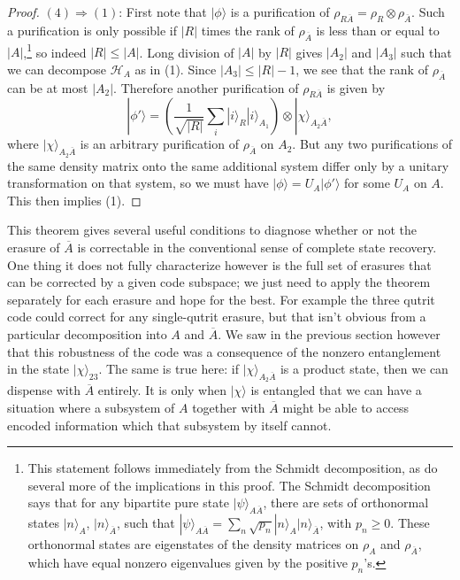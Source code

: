 \documentclass[12pt]{article}
\newcommand{\be}{\begin{equation}}
\newcommand{\ee}{\end{equation}}
\newcommand{\ran}{\rangle}
\newcommand{\HA}{\mathcal{H}_A}
\newcommand{\Ab}{\ol{A}}
\newcommand{\ol}{\overline}
\begin{document}
\begin{proof}
$(4) \Rightarrow (1)$: First note that $|\phi\ran$ is a purification of $\rho_{R\Ab}=\rho_{R}\otimes \rho_{\Ab}$. Such a purification is only possible if $|R|$ times the rank of $\rho_{\Ab}$ is less than or equal to $|A|$,\footnote{This statement follows immediately from the Schmidt decomposition, as do several more of the implications in this proof.  The Schmidt decomposition says that for any bipartite pure state $|\psi\ran_{A\Ab}$, there are sets of orthonormal states $|n\ran_A$, $|n\ran_{\Ab}$, such that $|\psi\ran_{A\Ab}=\sum_n \sqrt{p_n} |n\ran_A|n\ran_{\Ab}$, with $p_n\geq 0$.  These orthonormal states are eigenstates of the density matrices on $\rho_A$ and $\rho_{\Ab}$, which have equal nonzero eigenvalues given by the positive $p_n$'s.}  so indeed $|R|\leq |A|$.  Long division of $|A|$ by $|R|$ gives $|A_2|$ and $|A_3|$ such that we can decompose $\HA$ as in (1).  Since $|A_3|\leq|R|-1$, we see that the rank of $\rho_{\Ab}$ can be at most $|A_2|$.  Therefore another purification of $\rho_{R\Ab}$ is given by
\be
|\phi'\ran=\left(\frac{1}{\sqrt{|R|}}\sum_i|i\ran_R|i\ran_{A_1}\right)\otimes |\chi\ran_{A_2\ol{A}},
\ee
where $|\chi\ran_{A_2\Ab}$ is an arbitrary purification of $\rho_{\Ab}$ on $A_2$.  But any two purifications of the same density matrix onto the same additional system differ only by a unitary transformation on that system, so we must have $|\phi\ran=U_A|\phi'\ran$ for some $U_A$ on $A$.  This then implies (1).

 
\end{proof} 
This theorem gives several useful conditions to diagnose whether or not the erasure of $\Ab$ is correctable in the conventional sense of complete state recovery.  One thing it does not fully characterize however is the full set of erasures that can be corrected by a given code subspace; we just need to apply the theorem separately for each erasure and hope for the best.  For example the three qutrit code could correct for any single-qutrit erasure, but that isn't obvious from a particular decomposition into $A$ and $\Ab$.  We saw in the previous section however that this robustness of the code was a consequence of the nonzero entanglement in the state $|\chi\ran_{23}$.  The same is true here: if $|\chi\ran_{A_2 \Ab}$ is a product state, then we can dispense with $\Ab$ entirely.  It is only when $|\chi\ran$ is entangled that we can have a situation where a subsystem of $A$ together with $\Ab$ might be able to access encoded information which that subsystem by itself cannot.  
\end{document}
